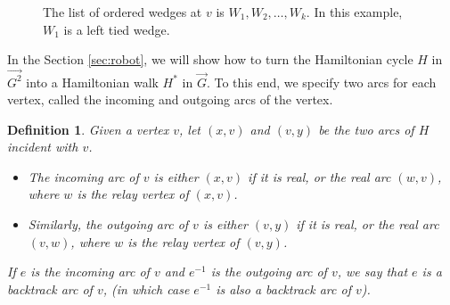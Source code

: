 \documentclass[12pt,letterpaper,oneside]{book}
\newtheorem{definition}[theorem]{Definition}
\begin{document}
 
\begin{figure}[htp] 
\centering 
{} 
\caption[The ordered list of wedges at a vertex]{The list of ordered wedges at $v$ is $W_1,W_2,\ldots,W_k$.  In this example, $W_1$ is a left tied wedge.  
\label{fig:wedgeorder}} 
\end{figure} 


In the Section \ref{sec:robot}, we will show how to turn the Hamiltonian cycle $H$ in $\vec{G^2}$ into a Hamiltonian walk $H^*$ in $\vec{G}$.  
To this end, we specify two arcs for each vertex, called the incoming and outgoing arcs of the vertex.  

\begin{definition}\label{def:io}
Given a vertex $v$, let $(x,v)$ and $(v,y)$ be the two arcs of $H$ incident with $v$.  
\begin{itemize}
\item The incoming arc of $v$ is either   
$(x,v)$ if it is real, or the real arc $(w,v)$, where $w$ is the relay vertex of $(x,v)$.
\item Similarly, the  
outgoing arc of $v$ is either $(v,y)$ if it is real, or  
the real arc $(v,w)$, where $w$ is the relay vertex of $(v,y)$.  
\end{itemize}
If $e$ is the incoming arc of $v$ and 
$e^{-1}$ is the outgoing arc of $v$, we say that $e$ is a backtrack arc of $v$, (in which case 
$e^{-1}$ is also a backtrack arc of $v$).   
\end{definition}
\end{document}
